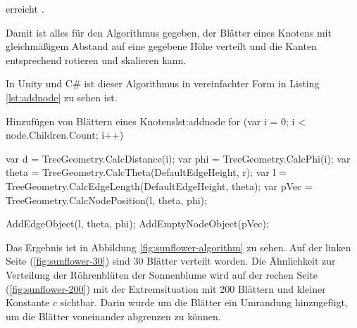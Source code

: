 erreicht \cite{wolfram2017spherical}.

Damit ist alles für den Algorithmus gegeben, der Blätter eines Knotens mit gleichmäßigem Abstand auf eine gegebene Höhe verteilt und die Kanten entsprechend rotieren und skalieren kann.

In Unity und C\# ist dieser Algorithmus in vereinfachter Form in Listing \ref{lst:addnode} zu sehen ist.

\begin{codesnippet}{Hinzufügen von Blättern eines Knotens}{lst:addnode}
for (var i = 0; i < node.Children.Count; i++)
{
    var d = TreeGeometry.CalcDistance(i);
    var phi = TreeGeometry.CalcPhi(i);
    var theta = TreeGeometry.CalcTheta(DefaultEdgeHeight, r);
    var l = TreeGeometry.CalcEdgeLength(DefaultEdgeHeight, theta);
    var pVec = TreeGeometry.CalcNodePosition(l, theta, phi);

    AddEdgeObject(l, theta, phi);
    AddEmptyNodeObject(pVec);
}
\end{codesnippet}

Das Ergebnis ist in Abbildung \ref{fig:sunflower-algorithm} zu sehen. Auf der linken Seite (\ref{fig:sunflower-30}) sind 30 Blätter verteilt worden. Die Ähnlichkeit zur Verteilung der Röhrenblüten der Sonnenblume wird auf der rechen Seite (\ref{fig:sunflower-200}) mit der Extremsituation mit 200 Blättern und kleiner Konstante $c$ sichtbar. Darin wurde um die Blätter ein Umrandung hinzugefügt, um die Blätter voneinander abgrenzen zu können.


